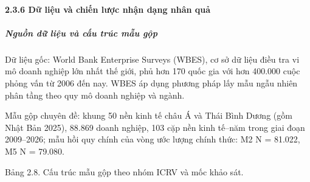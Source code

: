 \documentclass[
  a4paper,
  13pt]{extreport}
\begin{document}
\hypertarget{dux1eef-liux1ec7u-vuxe0-chiux1ebfn-lux1b0ux1ee3c-nhux1eadn-dux1ea1ng-nhuxe2n-quux1ea3}{%
\paragraph{2.3.6 Dữ liệu và chiến lược nhận dạng nhân
quả}\label{dux1eef-liux1ec7u-vuxe0-chiux1ebfn-lux1b0ux1ee3c-nhux1eadn-dux1ea1ng-nhuxe2n-quux1ea3}}

\hypertarget{nguux1ed3n-dux1eef-liux1ec7u-vuxe0-cux1ea5u-truxfac-mux1eabu-gux1ed9p}{%
\subparagraph{Nguồn dữ liệu và cấu trúc mẫu
gộp}\label{nguux1ed3n-dux1eef-liux1ec7u-vuxe0-cux1ea5u-truxfac-mux1eabu-gux1ed9p}}

Dữ liệu gốc: World Bank Enterprise Surveys (WBES), cơ sở dữ liệu điều
tra vi mô doanh nghiệp lớn nhất thế giới, phủ hơn 170 quốc gia với hơn
400.000 cuộc phỏng vấn từ 2006 đến nay. WBES áp dụng phương pháp lấy mẫu
ngẫu nhiên phân tầng theo quy mô doanh nghiệp và ngành.

Mẫu gộp chuyên đề: khung 50 nền kinh tế châu Á và Thái Bình Dương (gồm
Nhật Bản 2025), 88.869 doanh nghiệp, 103 cặp nền kinh tế--năm trong giai
đoạn 2009--2026; mẫu hồi quy chính của vòng ước lượng chính thức: M2 N =
81.022, M5 N = 79.080.

Bảng 2.8. Cấu trúc mẫu gộp theo nhóm ICRV và mốc khảo sát.
\end{document}
